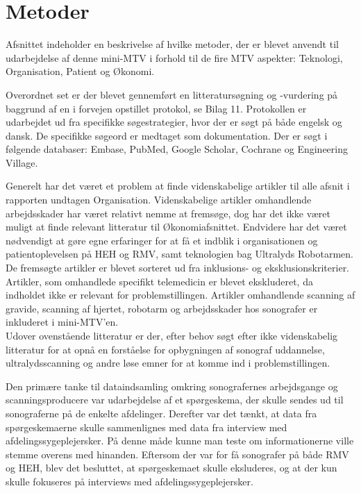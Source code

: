 \chapter{Metoder}
Afsnittet indeholder en beskrivelse af hvilke metoder, der er blevet anvendt til udarbejdelse af denne mini-MTV i forhold til de fire MTV aspekter: Teknologi, Organisation, Patient og Økonomi.

Overordnet set er der blevet gennemført en litteratursøgning og -vurdering på baggrund af en i forvejen opstillet protokol, se Bilag 11. Protokollen er udarbejdet ud fra specifikke søgestrategier, hvor der er søgt på både engelsk og dansk. De specifikke søgeord er medtaget som dokumentation. Der er søgt i følgende databaser: Embase, PubMed, Google Scholar, Cochrane og Engineering Village. 

Generelt har det været et problem at finde videnskabelige artikler til alle afsnit i rapporten undtagen Organisation. Videnskabelige artikler omhandlende arbejdsskader har været relativt nemme at fremsøge, dog har det ikke været muligt at finde relevant litteratur til Økonomiafsnittet. Endvidere har det været nødvendigt at gøre egne erfaringer for at få et indblik i organisationen og patientoplevelsen på HEH og RMV, samt teknologien bag Ultralyds Robotarmen.\\
De fremsøgte artikler er blevet sorteret ud fra inklusions- og eksklusionskriterier. Artikler, som omhandlede specifikt telemedicin er blevet ekskluderet, da indholdet ikke er relevant for problemstillingen. Artikler omhandlende scanning af gravide, scanning af hjertet, robotarm og arbejdsskader hos sonografer er inkluderet i mini-MTV'en.\\
Udover ovenstående litteratur er der, efter behov søgt efter ikke videnskabelig litteratur for at opnå en forståelse for opbygningen af sonograf uddannelse, ultralydsscanning og andre løse emner for at komme ind i problemstillingen. 

Den primære tanke til dataindsamling omkring sonografernes arbejdsgange og scanningsproducere var udarbejdelse af et spørgeskema, der skulle sendes ud til sonograferne på de enkelte afdelinger. Derefter var det tænkt, at data fra spørgeskemaerne skulle sammenlignes med data fra interview med afdelingssygeplejersker. På denne måde kunne man teste om informationerne ville stemme overens med hinanden. Eftersom der var for få sonografer på både RMV og HEH, blev det besluttet, at spørgeskemaet skulle eksluderes, og at der kun skulle fokuseres på interviews med afdelingssygeplejersker.


